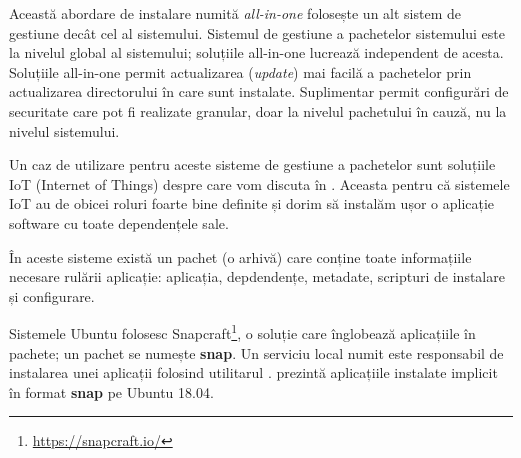 Această abordare de instalare numită \textit{all-in-one} folosește un alt sistem de gestiune decât cel al sistemului. Sistemul de gestiune a pachetelor sistemului este la nivelul global al sistemului; soluțiile all-in-one lucrează independent de acesta. Soluțiile all-in-one permit actualizarea (\textit{update}) mai facilă a pachetelor prin actualizarea directorului în care sunt instalate. Suplimentar permit configurări de securitate care pot fi realizate granular, doar la nivelul pachetului în cauză, nu la nivelul sistemului.

Un caz de utilizare pentru aceste sisteme de gestiune a pachetelor sunt soluțiile IoT (Internet of Things) despre care vom discuta în . Aceasta pentru că sistemele IoT au de obicei roluri foarte bine definite și dorim să instalăm ușor o aplicație software cu toate dependențele sale.

În aceste sisteme există un pachet (o arhivă) care conține toate informațiile necesare rulării aplicație: aplicația, depdendențe, metadate, scripturi de instalare și configurare.

Sistemele Ubuntu folosesc Snapcraft\footnote{\url{https://snapcraft.io/}}, o soluție care înglobează aplicațiile în pachete; un pachet se numește \textbf{snap}. Un serviciu local numit  este responsabil de instalarea unei aplicații folosind utilitarul .  prezintă aplicațiile instalate implicit în format \textbf{snap} pe Ubuntu 18.04.



